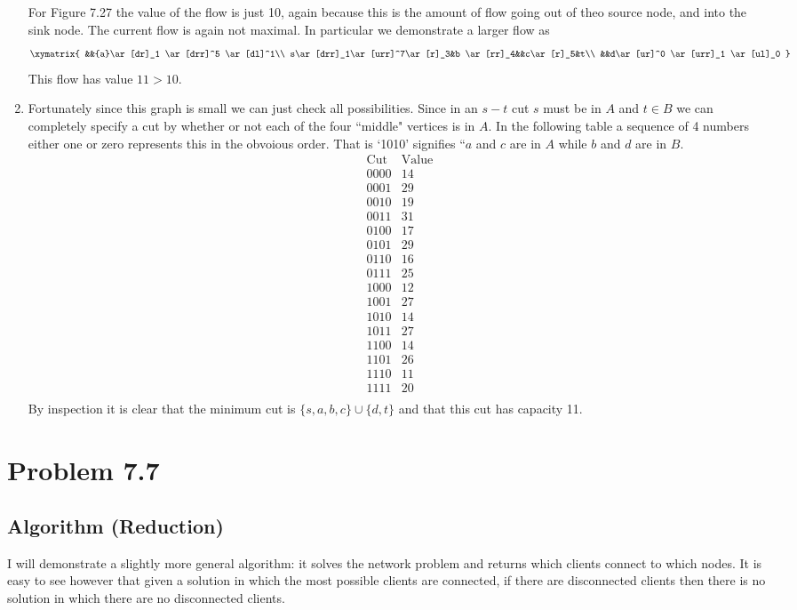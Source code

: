 \documentclass{article}
\begin{document}
\begin{enumerate}
For Figure 7.27 the value of the flow is just 10, again because this is the amount of flow going out of theo source node, and into the sink node. The current flow is again not maximal. In particular we demonstrate a larger flow as
\[
\xymatrix{
&&{a}\ar[dr]_1 \ar[drr]^5 \ar[dl]^1\\
s\ar[drr]_1\ar[urr]^7\ar[r]_3&b \ar[rr]_4&&c\ar[r]_5&t\\
&&d\ar[ur]^0 \ar[urr]_1 \ar[ul]_0
}
\]
This flow has value $11>10$.
\item Fortunately since this graph is small we can just check all possibilities. Since in an $s-t$ cut $s$ must be in $A$ and $t \in B$ we can completely specify a cut by whether or not each of the four ``middle" vertices is in $A$. In the following table a sequence of 4 numbers either one or zero represents this in the obvoious order. That is `1010' signifies ``$a$ and $c$ are in $A$ while $b$ and $d$ are in $B$. 
\[
\begin{array}{c|c}
\mathrm{Cut}&\mathrm{Value}\\
\hline 
0000&14\\
0001&29\\
0010&19\\
0011&31\\
0100&17\\
0101&29\\
0110&16\\
0111&25\\
1000&12\\
1001&27\\
1010&14\\
1011&27\\
1100&14\\
1101&26\\
1110&11\\
1111&20\\
\end{array}
\]
By inspection it is clear that the minimum cut is $\{s,a,b,c\}\cup\{d,t\}$ and that this cut has capacity 11.
\end{enumerate}
\section{Problem 7.7}
\subsection{Algorithm (Reduction)}
I will demonstrate a slightly more general algorithm: it solves the network problem and returns which clients connect to which nodes. It is easy to see however that given a solution in which the most possible clients are connected, if there are disconnected clients then there is no solution in which there are no disconnected clients.
\end{document}
